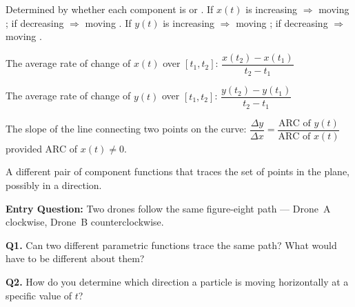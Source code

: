 \documentclass[10pt]{article}
\begin{document}
\begin{vocabbox}
\begin{description}[leftmargin=0pt, itemsep=6pt]
  \item[\termblanklong{direction of motion}]
    Determined by whether each component is
    \underline{\hspace{2.5cm}} or \underline{\hspace{2.5cm}}.
    If $x(t)$ is increasing $\Rightarrow$ moving \underline{\hspace{1.5cm}};
    if decreasing $\Rightarrow$ moving \underline{\hspace{1.5cm}}.
    If $y(t)$ is increasing $\Rightarrow$ moving \underline{\hspace{1.5cm}};
    if decreasing $\Rightarrow$ moving \underline{\hspace{1.5cm}}.

  \item[\termblanklong{ARC of $x(t)$}]
    The average rate of change of $x(t)$ over $[t_1, t_2]$:
    \quad $\dfrac{x(t_2) - x(t_1)}{t_2 - t_1}$

  \item[\termblanklong{ARC of $y(t)$}]
    The average rate of change of $y(t)$ over $[t_1, t_2]$:
    \quad $\dfrac{y(t_2) - y(t_1)}{t_2 - t_1}$

  \item[\termblanklong{slope of parametric curve}]
    The slope of the \underline{\hspace{2cm}} line connecting two points
    on the curve:
    \quad $\dfrac{\Delta y}{\Delta x} = \dfrac{\text{ARC of } y(t)}{\text{ARC of } x(t)}$
    \quad provided ARC of $x(t) \ne 0$.

  \item[\termblanklong{reparametrization}]
    A different pair of component functions that traces the
    \underline{\hspace{2.5cm}} set of points in the plane, possibly in a
    \underline{\hspace{2cm}} direction.
\end{description}
\end{vocabbox}

\vspace{0.08in}

\begin{hookbox}
\textbf{Entry Question:} Two drones follow the same figure-eight path ---
Drone~A clockwise, Drone~B counterclockwise.

\vspace{4pt}
\textbf{Q1.} Can two different parametric functions trace the same path?
What would have to be different about them?

\textbf{Q2.} How do you determine which direction a particle is moving
horizontally at a specific value of $t$?
\writeline
\end{hookbox}
\end{document}
